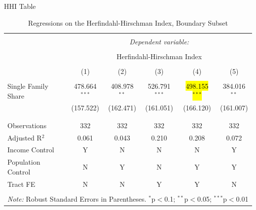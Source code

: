 \documentclass{beamer}
\makeatletter
\let\HL\hl
\renewcommand\hl{%
  \let\set@color\beamerorig@set@color
  \let\reset@color\beamerorig@reset@color
  \HL}
\makeatother
\begin{document}
\begin{frame}{HHI Table}
    \tiny
    \begin{table}[!htbp] \centering 
  \caption{Regressions on the Herfindahl-Hirschman Index, Boundary Subset} 
  \label{tab:HHI_Causal} 
\begin{tabular}{@{\extracolsep{5pt}}lccccc} 
\\[-1.8ex]\hline 
\hline \\[-1.8ex] 
 & \multicolumn{5}{c}{\textit{Dependent variable:}} \\ 
\cline{2-6} 
\\[-1.8ex] & \multicolumn{5}{c}{Herfindahl-Hirschman Index} \\ 
\\[-1.8ex] & (1) & (2) & (3) & (4) & (5)\\ 
\hline \\[-1.8ex] 
 Single Family Share & 478.664$^{***}$ & 408.978$^{**}$ & 526.791$^{***}$ & \hl{498.155$^{***}$} & 384.016$^{**}$ \\ 
  & (157.522) & (162.471) & (161.051) & (166.120) & (161.007) \\ 
  & & & & & \\ 
\hline \\[-1.8ex] 
Observations & 332 & 332 & 332 & 332 & 332 \\ 
Adjusted R$^{2}$ & 0.061 & 0.043 & 0.210 & 0.208 & 0.072 \\ 
\hline
Income Control & Y & N & N & N & Y\\
Population Control & N & Y & N & Y & Y\\
Tract FE & N & N & Y & Y & N\\
\hline 
\hline \\[-1.8ex] 
\multicolumn{6}{l}{\textit{Note:} Robust Standard Errors in Parentheses. $^{*}$p$<$0.1; $^{**}$p$<$0.05; $^{***}$p$<$0.01} \\
\end{tabular} 
\end{table} 
\end{frame}
\end{document}
